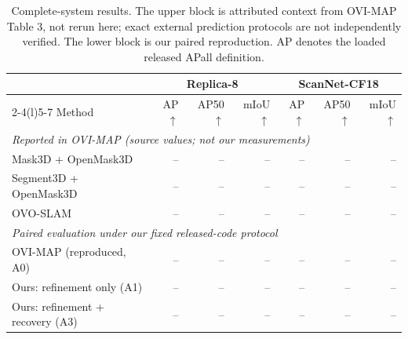 \begin{table}[!ht]
\centering
\caption{Complete-system results. The upper block is attributed context from OVI-MAP Table 3, not rerun here; exact external prediction protocols are not independently verified. The lower block is our paired reproduction. AP denotes the loaded released APall definition.}
\label{tab:main}
\fontsize{9}{10.5}\selectfont
\setlength{\tabcolsep}{5pt}
\begin{tabular*}{\textwidth}{@{\extracolsep{\fill}}lrrrrrr@{}}
\toprule
& \multicolumn{3}{c}{Replica-8} & \multicolumn{3}{c}{ScanNet-CF18} \\
\cmidrule(lr){2-4}\cmidrule(l){5-7}
Method & AP$\uparrow$ & AP50$\uparrow$ & mIoU$\uparrow$ & AP$\uparrow$ & AP50$\uparrow$ & mIoU$\uparrow$ \\
\midrule
\multicolumn{7}{l}{\emph{Reported in OVI-MAP (source values; not our measurements)}}\\
Mask3D + OpenMask3D & -- & -- & -- & -- & -- & -- \\
Segment3D + OpenMask3D & -- & -- & -- & -- & -- & -- \\
OVO-SLAM & -- & -- & -- & -- & -- & -- \\
\midrule
\multicolumn{7}{l}{\emph{Paired evaluation under our fixed released-code protocol}}\\
OVI-MAP (reproduced, A0) & -- & -- & -- & -- & -- & -- \\
Ours: refinement only (A1) & -- & -- & -- & -- & -- & -- \\
Ours: refinement + recovery (A3) & -- & -- & -- & -- & -- & -- \\
\bottomrule
\end{tabular*}
\end{table}
